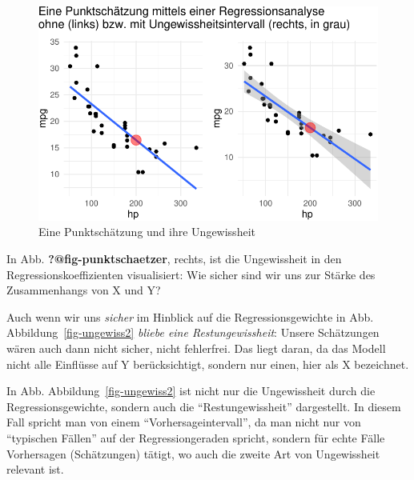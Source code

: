 \documentclass[
  a4paper,
  DIV=11]{scrreprt}
\theoremstyle{definition}
\theoremstyle{remark}
\begin{document}
\begin{figure}

{\centering \includegraphics{./Inferenz_files/figure-pdf/fig-punktschaetzer2-1.pdf}

}

\caption{\label{fig-punktschaetzer2}Eine Punktschätzung und ihre
Ungewissheit}

\end{figure}

In Abb. \textbf{?@fig-punktschaetzer}, rechts, ist die Ungewissheit in
den Regressionskoeffizienten visualisiert: Wie sicher sind wir uns zur
Stärke des Zusammenhangs von X und Y?

Auch wenn wir uns \emph{sicher} im Hinblick auf die Regressionsgewichte
in Abb. Abbildung~\ref{fig-ungewiss2} \emph{bliebe eine
Restungewissheit}: Unsere Schätzungen wären auch dann nicht sicher,
nicht fehlerfrei. Das liegt daran, da das Modell nicht alle Einflüsse
auf Y berücksichtigt, sondern nur einen, hier als X bezeichnet.

In Abb. Abbildung~\ref{fig-ungewiss2} ist nicht nur die Ungewissheit
durch die Regressionsgewichte, sondern auch die ``Restungewissheit''
dargestellt. In diesem Fall spricht man von einem
``Vorhersageintervall'', da man nicht nur von ``typischen Fällen'' auf
der Regressiongeraden spricht, sondern für echte Fälle Vorhersagen
(Schätzungen) tätigt, wo auch die zweite Art von Ungewissheit relevant
ist.
\end{document}
